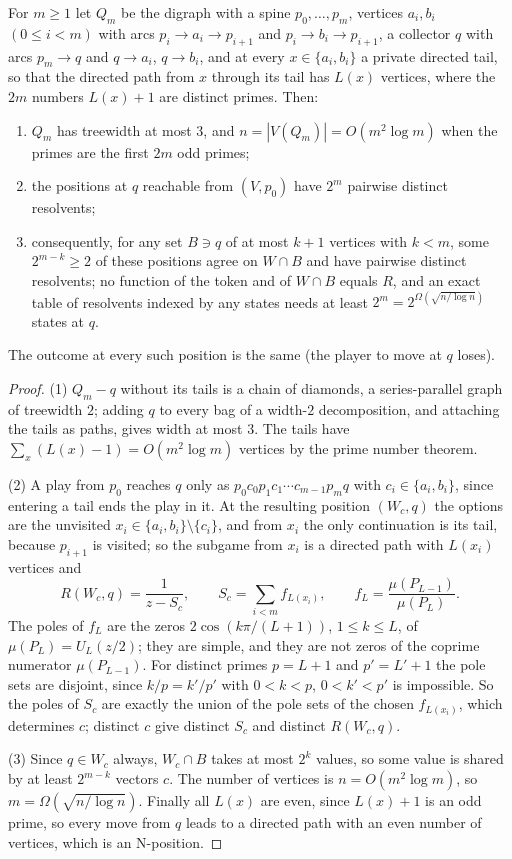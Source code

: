 \begin{proposition}[memory]\label{prop:memory}
For $m\ge1$ let $Q_m$ be the digraph with a spine $p_0,\dots,p_m$, vertices $a_i,b_i$ $(0\le i<m)$ with arcs $p_i\to a_i\to p_{i+1}$ and $p_i\to b_i\to p_{i+1}$, a collector $q$ with arcs $p_m\to q$ and $q\to a_i$, $q\to b_i$, and at every $x\in\{a_i,b_i\}$ a private directed tail, so that the directed path from $x$ through its tail has $L(x)$ vertices, where the $2m$ numbers $L(x)+1$ are distinct primes. Then:
\begin{enumerate}[label=\textup{(\arabic*)}]
\item $Q_m$ has treewidth at most $3$, and $n=|V(Q_m)|=O(m^{2}\log m)$ when the primes are the first $2m$ odd primes;
\item the positions at $q$ reachable from $(V,p_0)$ have $2^{m}$ pairwise distinct resolvents;
\item consequently, for any set $B\ni q$ of at most $k+1$ vertices with $k<m$, some $2^{m-k}\ge2$ of these positions agree on $W\cap B$ and have pairwise distinct resolvents; no function of the token and of $W\cap B$ equals $R$, and an exact table of resolvents indexed by any states needs at least $2^{m}=2^{\Omega(\sqrt{n/\log n})}$ states at $q$.
\end{enumerate}
The outcome at every such position is the same \textup{(}the player to move at $q$ loses\textup{)}.
\end{proposition}
\begin{proof}
(1) $Q_m-q$ without its tails is a chain of diamonds, a series-parallel graph of treewidth $2$; adding $q$ to every bag of a width-$2$ decomposition, and attaching the tails as paths, gives width at most $3$. The tails have $\sum_x(L(x)-1)=O(m^{2}\log m)$ vertices by the prime number theorem.

(2) A play from $p_0$ reaches $q$ only as $p_0c_0p_1c_1\cdots c_{m-1}p_mq$ with $c_i\in\{a_i,b_i\}$, since entering a tail ends the play in it. At the resulting position $(W_c,q)$ the options are the unvisited $x_i\in\{a_i,b_i\}\setminus\{c_i\}$, and from $x_i$ the only continuation is its tail, because $p_{i+1}$ is visited; so the subgame from $x_i$ is a directed path with $L(x_i)$ vertices and
\[
R(W_c,q)=\frac{1}{z-S_c},\qquad S_c=\sum_{i<m}f_{L(x_i)},\qquad f_L=\frac{\mu(P_{L-1})}{\mu(P_L)}.
\]
The poles of $f_L$ are the zeros $2\cos(k\pi/(L+1))$, $1\le k\le L$, of $\mu(P_L)=U_L(z/2)$; they are simple, and they are not zeros of the coprime numerator $\mu(P_{L-1})$. For distinct primes $p=L+1$ and $p'=L'+1$ the pole sets are disjoint, since $k/p=k'/p'$ with $0<k<p$, $0<k'<p'$ is impossible. So the poles of $S_c$ are exactly the union of the pole sets of the chosen $f_{L(x_i)}$, which determines $c$; distinct $c$ give distinct $S_c$ and distinct $R(W_c,q)$.

(3) Since $q\in W_c$ always, $W_c\cap B$ takes at most $2^{k}$ values, so some value is shared by at least $2^{m-k}$ vectors $c$. The number of vertices is $n=O(m^{2}\log m)$, so $m=\Omega(\sqrt{n/\log n})$. Finally all $L(x)$ are even, since $L(x)+1$ is an odd prime, so every move from $q$ leads to a directed path with an even number of vertices, which is an N-position.
\end{proof}

